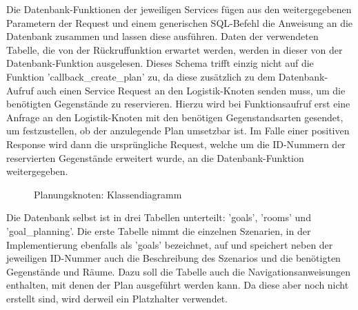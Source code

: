 Die Datenbank-Funktionen der jeweiligen Services fügen aus den weitergegebenen Parametern der Request und einem generischen SQL-Befehl die Anweisung an die Datenbank zusammen und lassen diese ausführen. Daten der verwendeten Tabelle, die von der Rückruffunktion erwartet werden, werden in dieser von der Datenbank-Funktion ausgelesen. Dieses Schema trifft einzig nicht auf die Funktion 'callback\_create\_plan' zu, da diese zusätzlich zu dem Datenbank-Aufruf auch einen Service Request an den Logistik-Knoten senden muss, um die benötigten Gegenstände zu reservieren. Hierzu wird bei Funktionsaufruf erst eine Anfrage an den Logistik-Knoten mit den benötigen Gegenstandsarten gesendet, um festzustellen, ob der anzulegende Plan umsetzbar ist. Im Falle einer positiven Response wird dann die ursprüngliche Request, welche um die ID-Nummern der reservierten Gegenstände erweitert wurde, an die Datenbank-Funktion weitergegeben.

\begin{figure}
\begin{center}
\caption{Planungsknoten: Klassendiagramm}
\end{center}
\end{figure}

Die Datenbank selbst ist in drei Tabellen unterteilt: 'goals', 'rooms' und 'goal\_planning'. Die erste Tabelle nimmt die einzelnen Szenarien, in der Implementierung ebenfalls als 'goals' bezeichnet, auf und speichert neben der jeweiligen ID-Nummer auch die Beschreibung des Szenarios und die benötigten Gegenstände und Räume. Dazu soll die Tabelle auch die Navigationsanweisungen enthalten, mit denen der Plan ausgeführt werden kann. Da diese aber noch nicht erstellt sind, wird derweil ein Platzhalter verwendet.

